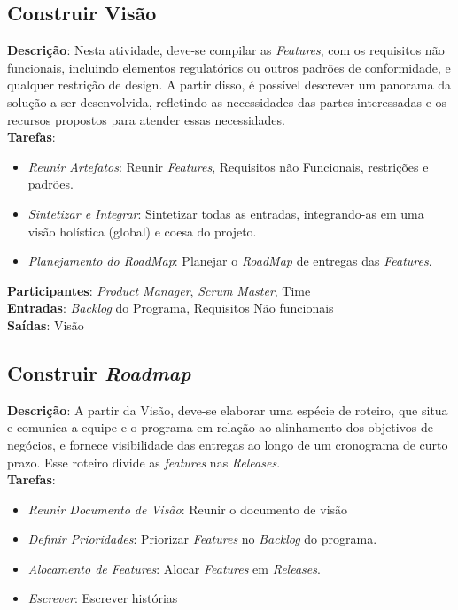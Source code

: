 \subsection{Construir Visão}
  \textbf{Descrição}: Nesta atividade, deve-se compilar as \textit{Features}, com os requisitos não funcionais, incluindo elementos
  regulatórios ou outros padrões de conformidade, e qualquer restrição de design. A partir disso, é possível descrever um panorama da solução a
  ser desenvolvida, refletindo as necessidades das partes interessadas e os recursos propostos para atender essas necessidades. \\

  \textbf{Tarefas}:
  \begin{itemize}
   \item \indent \textit{Reunir Artefatos}: Reunir \textit{Features}, Requisitos não Funcionais, restrições e padrões.

   \item \indent \textit{Sintetizar e Integrar}: Sintetizar todas as entradas, integrando-as em uma visão holística (global) e coesa do projeto.

   \item \indent \textit{Planejamento do \textit{RoadMap}}: Planejar o \textit{RoadMap} de entregas das \textit{Features}.
  \end{itemize}

  \textbf{Participantes}: \textit{Product Manager}, \textit{Scrum Master}, Time \\

  \textbf{Entradas}: \textit{Backlog} do Programa, Requisitos Não funcionais \\

  \textbf{Saídas}:  Visão\\

\subsection{Construir \textit{Roadmap}}
  \textbf{Descrição}: A partir da Visão, deve-se elaborar uma espécie de roteiro, que situa e comunica a equipe e o programa em relação ao
  alinhamento dos objetivos de negócios, e fornece visibilidade das entregas ao longo de um cronograma de curto prazo.
  Esse roteiro divide as \textit{features} nas \textit{Releases}. \\

  \textbf{Tarefas}:
  \begin{itemize}
   \item \indent \textit{Reunir Documento de Visão}: Reunir o documento de visão

   \item \indent \textit{Definir Prioridades}: Priorizar \textit{Features} no \textit{Backlog} do programa.

   \item \indent \textit{Alocamento de \textit{Features}}: Alocar \textit{Features} em \textit{Releases}.

   \item \indent \textit{Escrever}: Escrever histórias
  \end{itemize}

